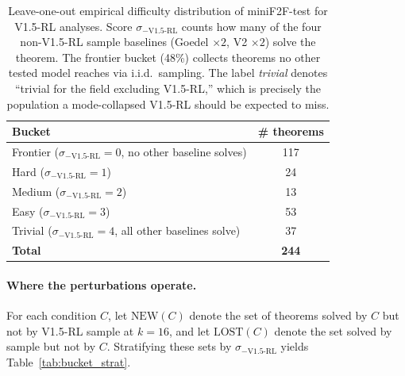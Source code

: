 \documentclass{article}
\begin{document}
\begin{table}[h]
\centering
\small
\begin{tabular}{lc}
\toprule
\textbf{Bucket} & \textbf{\# theorems} \\
\midrule
Frontier ($\sigma_{-\text{V1.5-RL}}{=}0$, no other baseline solves)  & 117 \\
Hard     ($\sigma_{-\text{V1.5-RL}}{=}1$)                              & 24  \\
Medium   ($\sigma_{-\text{V1.5-RL}}{=}2$)                              & 13  \\
Easy     ($\sigma_{-\text{V1.5-RL}}{=}3$)                              & 53  \\
Trivial  ($\sigma_{-\text{V1.5-RL}}{=}4$, all other baselines solve)  & 37  \\
\midrule
\textbf{Total}                                                          & \textbf{244} \\
\bottomrule
\end{tabular}
\caption{Leave-one-out empirical difficulty distribution of miniF2F-test for V1.5-RL analyses. Score $\sigma_{-\text{V1.5-RL}}$ counts how many of the four non-V1.5-RL sample baselines (Goedel ${\times}2$, V2 ${\times}2$) solve the theorem. The frontier bucket (48\%) collects theorems no other tested model reaches via i.i.d.\ sampling. The label \emph{trivial} denotes ``trivial for the field excluding V1.5-RL,'' which is precisely the population a mode-collapsed V1.5-RL should be expected to miss.}
\label{tab:difficulty_dist}
\end{table}

\paragraph{Where the perturbations operate.}
For each condition $C$, let $\text{NEW}(C)$ denote the set of theorems solved by $C$ but not by V1.5-RL sample at $k{=}16$, and let $\text{LOST}(C)$ denote the set solved by sample but not by $C$. Stratifying these sets by $\sigma_{-\text{V1.5-RL}}$ yields Table~\ref{tab:bucket_strat}.
\end{document}
